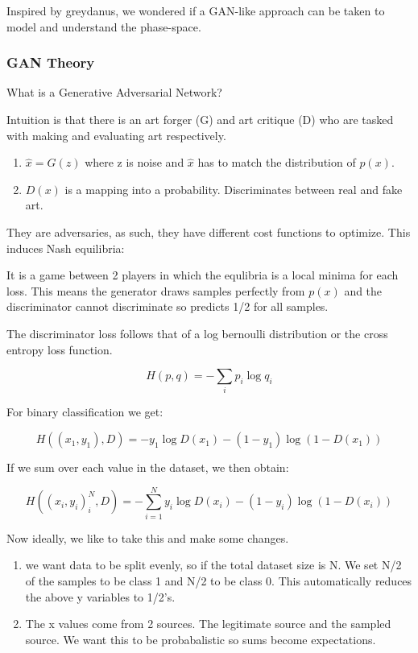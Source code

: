 \documentclass{article}
\begin{document}
Inspired by greydanus, we wondered if a GAN-like approach can be taken to model and understand the phase-space.

\subsubsection*{GAN Theory}

What is a Generative Adversarial Network?

Intuition is that there is an art forger (G) and art critique (D) who are tasked with making and evaluating art respectively. 

\begin{enumerate}
\item $\hat{x} = G(z) $ where z is noise and $\hat{x}$ has to match the distribution of $p(x)$.

\item $D(x)$ is a mapping into a probability. Discriminates between real and fake art.
\end{enumerate}

They are adversaries, as such, they have different cost functions to optimize. This induces Nash equilibria:

It is a game between 2 players in which the equlibria is a local minima for each loss. This means the generator draws samples perfectly from $p(x)$ and the discriminator cannot discriminate so predicts 1/2 for all samples.

The discriminator loss follows that of a log bernoulli distribution or the cross entropy loss function.

$$ H(p,q) = -\sum_i p_i \log q_i$$

For binary classification we get:

$$ H((x_1,y_1),D) = -y_1 \log D(x_1) - (1-y_1) \log (1-D(x_1)) $$

If we sum over each value in the dataset, we then obtain:

$$ H((x_i,y_i)_i^N,D) = -\sum_{i=1}^N y_i \log D(x_i) - (1-y_i) \log (1-D(x_i)) $$


Now ideally, we like to take this and make some changes.

\begin{enumerate}
\item we want data to be split evenly, so if the total dataset size is N. We set N/2 of the samples to be class 1 and N/2 to be class 0. This automatically reduces the above y variables to 1/2's. 
\item The x values come from 2 sources. The legitimate source and the sampled source. We want this to be probabalistic so sums become expectations.
\end{enumerate}
\end{document}
